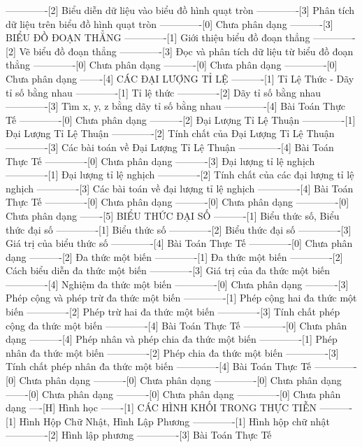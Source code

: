 -------------[2] Biểu diễn dữ liệu vào biểu đồ hình quạt tròn
-------------[3] Phân tích dữ liệu trên biểu đồ hình quạt tròn
-------------[0] Chưa phân dạng
----------[3] BIỂU ĐỒ ĐOẠN THẲNG
-------------[1] Giới thiệu biểu đồ đoạn thẳng
-------------[2] Vẽ biểu đồ đoạn thẳng
-------------[3] Đọc và phân tích dữ liệu từ biểu đồ đoạn thẳng
-------------[0] Chưa phân dạng
----------[0] Chưa phân dạng
-------------[0] Chưa phân dạng
-------[4] CÁC ĐẠI LƯỢNG TỈ LỆ
----------[1] Tỉ Lệ Thức - Dãy tỉ số bằng nhau
-------------[1] Tỉ lệ thức
-------------[2] Dãy tỉ số bằng nhau
-------------[3] Tìm x, y, z bằng dãy tỉ số bằng nhau
-------------[4] Bài Toán Thực Tế
-------------[0] Chưa phân dạng
----------[2] Đại Lượng Tỉ Lệ Thuận
-------------[1] Đại Lượng Tỉ Lệ Thuận
-------------[2] Tính chất của Đại Lượng Tỉ Lệ Thuận
-------------[3] Các bài toán về Đại Lượng Tỉ Lệ Thuận
-------------[4] Bài Toán Thực Tế
-------------[0] Chưa phân dạng
----------[3] Đại lượng tỉ lệ nghịch
-------------[1] Đại lượng tỉ lệ nghịch
-------------[2] Tính chất của các đại lượng tỉ lệ nghịch
-------------[3] Các bài toán về đại lượng tỉ lệ nghịch
-------------[4] Bài Toán Thực Tế
-------------[0] Chưa phân dạng
----------[0] Chưa phân dạng
-------------[0] Chưa phân dạng
-------[5] BIỂU THỨC ĐẠI SỐ
----------[1] Biểu thức số, Biểu thức đại số
-------------[1] Biểu thức số
-------------[2] Biểu thức đại số
-------------[3] Giá trị của biểu thức số
-------------[4] Bài Toán Thực Tế
-------------[0] Chưa phân dạng
----------[2] Đa thức một biến
-------------[1] Đa thức một biến
-------------[2] Cách biểu diễn đa thức một biến
-------------[3] Giá trị của đa thức một biến
-------------[4] Nghiệm đa thức một biến
-------------[0] Chưa phân dạng
----------[3] Phép cộng và phép trừ đa thức một biến
-------------[1] Phép cộng hai đa thức một biến
-------------[2] Phép trừ hai đa thức một biến
-------------[3] Tính chất phép cộng đa thức một biến
-------------[4] Bài Toán Thực Tế
-------------[0] Chưa phân dạng
----------[4] Phép nhân và phép chia đa thức một biến
-------------[1] Phép nhân đa thức một biến
-------------[2] Phép chia đa thức một biến
-------------[3] Tính chất phép nhân đa thức một biến
-------------[4] Bài Toán Thực Tế
-------------[0] Chưa phân dạng
----------[0] Chưa phân dạng
-------------[0] Chưa phân dạng
-------[0] Chưa phân dạng
----------[0] Chưa phân dạng
-------------[0] Chưa phân dạng
----[H] Hình học
-------[1] CÁC HÌNH KHỐI TRONG THỰC TIỄN
----------[1] Hình Hộp Chữ Nhật, Hình Lập Phương
-------------[1] Hình hộp chữ nhật
-------------[2] Hình lập phương
-------------[3] Bài Toán Thực Tế

